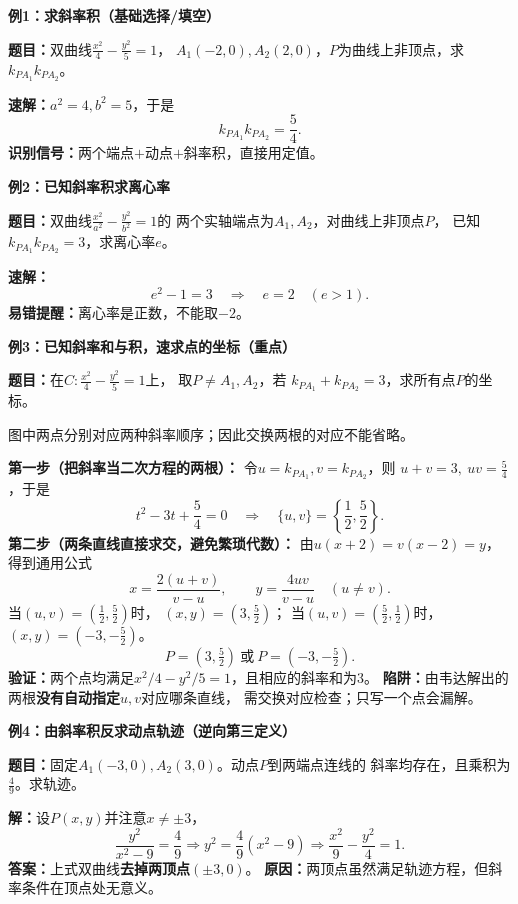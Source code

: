 \clearpage
\begin{examplebox}
\textbf{\textcolor{CExample}{例1：求斜率积（基础选择/填空）}}

\textbf{题目：}双曲线\(\frac{x^2}{4}-\frac{y^2}{5}=1\)，
\(A_1(-2,0), A_2(2,0)\)，\(P\)为曲线上非顶点，求\(k_{PA_1}k_{PA_2}\)。

\textbf{速解：}\(a^2=4,b^2=5\)，于是
\[
 \boxed{k_{PA_1}k_{PA_2}=\frac54}.
\]
\textbf{识别信号：}两个端点\(+\)动点\(+\)斜率积，直接用定值。

\medskip
\textbf{\textcolor{CExample}{例2：已知斜率积求离心率}}

\textbf{题目：}双曲线\(\frac{x^2}{a^2}-\frac{y^2}{b^2}=1\)的
两个实轴端点为\(A_1,A_2\)，对曲线上非顶点\(P\)，
已知\(k_{PA_1}k_{PA_2}=3\)，求离心率\(e\)。

\textbf{速解：}
\[
 e^2-1=3\quad\Longrightarrow\quad
 \boxed{e=2}\quad(e>1).
\]
\textbf{易错提醒：}离心率是正数，不能取\(-2\)。

\medskip
\textbf{\textcolor{CExample}{例3：已知斜率和与积，速求点的坐标（重点）}}

\textbf{题目：}在\(C:\frac{x^2}{4}-\frac{y^2}{5}=1\)上，
取\(P\ne A_1,A_2\)，若
\(k_{PA_1}+k_{PA_2}=3\)，求所有点\(P\)的坐标。

\begin{center}

\end{center}
图中两点分别对应两种斜率顺序；因此交换两根的对应不能省略。

\textbf{第一步（把斜率当二次方程的两根）：}
令\(u=k_{PA_1},v=k_{PA_2}\)，则
\(u+v=3,\ uv=\frac54\)，于是
\[
 t^2-3t+\frac54=0
 \quad\Longrightarrow\quad \{u,v\}=\left\{\frac12,\frac52\right\}.
\]
\textbf{第二步（两条直线直接求交，避免繁琐代数）：}
由\(u(x+2)=v(x-2)=y\)，得到通用公式
\[
 \boxed{x=\frac{2(u+v)}{v-u},\qquad
 y=\frac{4uv}{v-u}}\quad(u\ne v).
\]
当\((u,v)=(\frac12,\frac52)\)时，
\((x,y)=(3,\frac52)\)；
当\((u,v)=(\frac52,\frac12)\)时，
\((x,y)=(-3,-\frac52)\)。
\[
 \boxed{P=(3,\tfrac52)\ \text{或}\ P=(-3,-\tfrac52)}.
\]
\textbf{验证：}两个点均满足\(x^2/4-y^2/5=1\)，且相应的斜率和为\(3\)。
\textbf{陷阱：}由韦达解出的两根\textbf{没有自动指定}\(u,v\)对应哪条直线，
需交换对应检查；只写一个点会漏解。

\medskip
\textbf{\textcolor{CExample}{例4：由斜率积反求动点轨迹（逆向第三定义）}}

\textbf{题目：}固定\(A_1(-3,0),A_2(3,0)\)。动点\(P\)到两端点连线的
斜率均存在，且乘积为\(\frac49\)。求轨迹。

\textbf{解：}设\(P(x,y)\)并注意\(x\ne\pm3\)，
\[
 \frac{y^2}{x^2-9}=\frac49
 \Longrightarrow y^2=\frac49(x^2-9)
 \Longrightarrow\boxed{\frac{x^2}{9}-\frac{y^2}{4}=1}.
\]
\textbf{答案：}上式双曲线\textbf{去掉两顶点}\((\pm3,0)\)。
\textbf{原因：}两顶点虽然满足轨迹方程，但斜率条件在顶点处无意义。


\end{examplebox}

